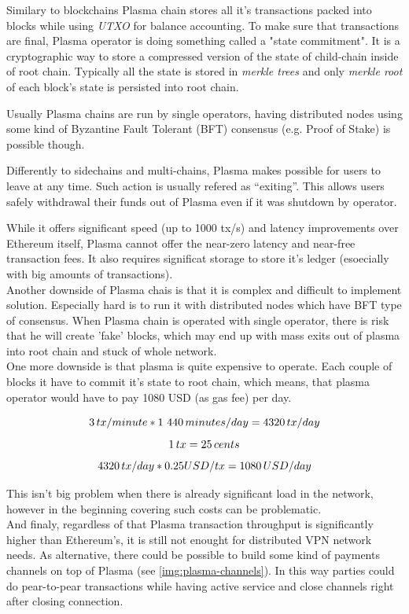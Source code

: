 \documentclass[a4paper,12pt]{article}
\begin{document}
Similary to blockchains Plasma chain stores all it's transactions packed into 
blocks while using \textit{UTXO} for balance accounting. To make sure that 
transactions are final, Plasma operator is doing something called a "state 
commitment". It is a cryptographic way to store a compressed version of the 
state of child-chain inside of root chain. Typically all the state is stored in
\textit{merkle trees} and only \textit{merkle root} of each block's state is 
persisted into root chain.

Usually Plasma chains are run by single operators, having distributed nodes 
using some kind of Byzantine Fault Tolerant (BFT) consensus (e.g. Proof of 
Stake) is possible though.

Differently to sidechains and multi-chains, Plasma makes possible for users to 
leave at any time. Such action is usually refered as “exiting”. This allows users 
safely withdrawal their funds out of Plasma even if it was shutdown by operator.

While it offers significant speed (up to 1000 tx/s) and latency improvements 
over Ethereum itself, Plasma cannot offer the near-zero latency and near-free 
transaction fees. It also requires significat storage to store it's ledger
(esoecially with big amounts of transactions).\\

Another downside of Plasma chais is that it is complex and difficult to 
implement solution. Especially hard is to run it with distributed nodes which 
have BFT type of consensus. When Plasma chain is operated with single operator, 
there is risk that he will create 'fake' blocks, which may end up with mass 
exits out of plasma into root chain and stuck of whole network.\\

One more downside is that plasma is quite expensive to operate. Each couple of 
blocks it have to commit it's state to root chain, which means, that plasma 
operator would have to pay 1080 USD (as gas fee) per day. 

\[ 3 \thinspace tx / minute * 1 440 \thinspace minutes / day = 4320 \thinspace tx/day \]
\[ 1 \thinspace tx = 25 \thinspace cents \]
\[ 4320 \thinspace tx/day * 0.25 USD/tx = 1080 \thinspace USD/day \]

This isn't big problem when there is already significant load in the network, 
however in the beginning covering such costs can be problematic.\\

And finaly, regardless of that Plasma transaction throughput is significantly 
higher than Ethereum's, it is still not enought for distributed VPN network 
needs. As alternative, there could be possible to build some kind of payments 
channels on top of Plasma (see \ref{img:plasma-channels}). In this way parties 
could do pear-to-pear transactions while having active service and close 
channels right after closing connection. 
\end{document}
